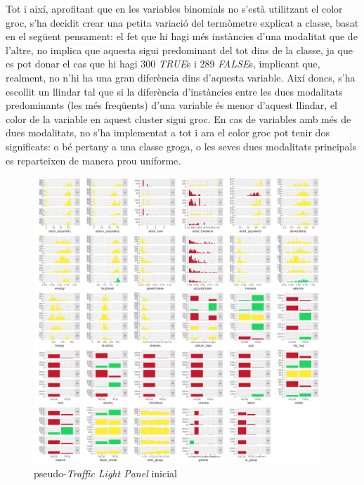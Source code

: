 Tot i així, aprofitant que en les variables binomials no s'està utilitzant el color groc, s'ha decidit crear una petita variació del termòmetre explicat a classe, basat en el següent pensament: el fet que hi hagi més instàncies d'una modalitat que de l'altre, no implica que aquesta sigui predominant del tot dins de la classe, ja que es pot donar el cas que hi hagi 300 \textit{TRUE}s i 289 \textit{FALSE}s, implicant que, realment, no n'hi ha una gran diferència dins d'aquesta variable. Així doncs, s'ha escollit un llindar tal que si la diferència d'instàncies entre les dues modalitats predominants (les més freqüents) d'una variable és menor d'aquest llindar, el color de la variable en aquest cluster sigui groc. En cas de variables amb més de dues modalitats, no s'ha implementat a tot i ara el color groc pot tenir dos significats: o bé pertany a una classe groga, o les seves dues modalitats principals es reparteixen de manera prou uniforme.
\begin{figure}[H] 
    \centering
    \includegraphics[width=0.96\textwidth]{Images/5_TLP/TLP.png}
    \caption{pseudo-\emph{Traffic Light Panel} inicial}
    \label{fig:5_TLP:TLP_og}
\end{figure}


